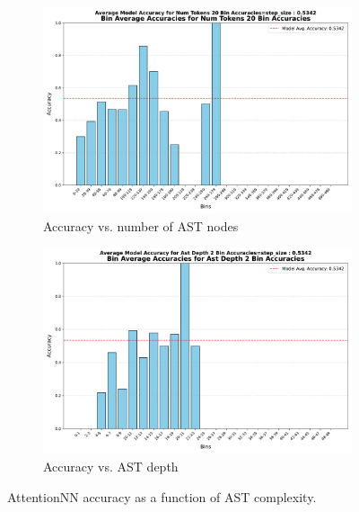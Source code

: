 \documentclass[conference]{IEEEtran}
\begin{document}
\begin{figure}[!b]
    \centering
    \begin{subfigure}{\columnwidth}
        \centering
        \includegraphics[width=\linewidth]{figures/attention_nn/ann_acc_num_nodes.pdf}
        \caption{Accuracy vs. number of AST nodes}
        \label{fig:ann_acc_nodes}
    \end{subfigure}
    \hfill
    \begin{subfigure}{\columnwidth}
        \centering
        \includegraphics[width=\linewidth]{figures/attention_nn/ann_acc_depth.pdf}
        \caption{Accuracy vs. AST depth}
        \label{fig:ann_acc_depth}
    \end{subfigure}
    \caption{AttentionNN accuracy as a function of AST complexity.}
    \label{fig:ann_acc}
\end{figure}
\end{document}
